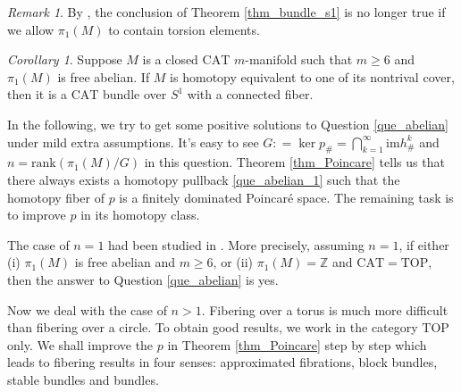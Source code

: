 \documentclass[12pt]{amsart}
\theoremstyle{plain}
\theoremstyle{definition}
\theoremstyle{question}
\theoremstyle{remark}
\newtheorem{remark}[theorem]{Remark}
\theoremstyle{assumption}
\numberwithin{equation}{section}
\theoremstyle{bigthm}
\newtheorem{bigcor}[bigthm]{Corollary}
\begin{document}
\begin{remark}
By \cite[Theorems~C~\&~D]{Qin_Su_Wang}, the conclusion of Theorem \ref{thm_bundle_s1} is no longer true if we allow $\pi_{1} (M)$ to contain torsion elements.
\end{remark}

\begin{bigcor}
Suppose $M$ is a closed $\mathrm{CAT}$ $m$-manifold such that $m \ge 6$ and $\pi_{1} (M)$ is free abelian. If $M$ is homotopy equivalent to one of its nontrival cover, then it is a $\mathrm{CAT}$ bundle over $S^{1}$ with a connected fiber.
\end{bigcor}

In the following, we try to get some positive solutions to Question \ref{que_abelian} under mild extra assumptions. It's easy to see $G: = \ker p_{\#} = \bigcap_{k=1}^{\infty} \mathrm{im} h_{\#}^{k}$ and $n = \mathrm{rank} (\pi_{1} (M) / G)$ in this question. Theorem \ref{thm_Poincare} tells us that there always exists a homotopy pullback \eqref{que_abelian_1} such that the homotopy fiber of $p$ is a finitely dominated Poincar\'{e} space. The remaining task is to improve $p$ in its homotopy class.

The case of $n=1$ had been studied in \cite{Qin_Su_Wang}. More precisely, assuming $n=1$, if either (i) $\pi_{1} (M)$ is free abelian and $m \ge 6$, or (ii) $\pi_{1} (M) = \mathbb{Z}$ and $\mathrm{CAT} = \mathrm{TOP}$, then the answer to Question \ref{que_abelian} is yes.

Now we deal with the case of $n>1$. Fibering over a torus is much more difficult than fibering over a circle. To obtain good results, we work in the category $\mathrm{TOP}$ only. We shall improve the $p$ in Theorem \ref{thm_Poincare} step by step which leads to fibering results in four senses: approximated fibrations, block bundles, stable bundles and bundles.
\end{document}
